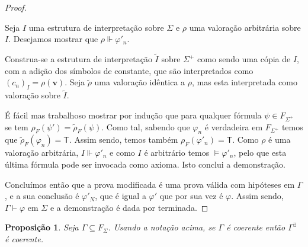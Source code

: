 \documentclass{report}
\newtheorem{prop}{Proposição}
\theoremstyle{definition}
\theoremstyle{remark}
\renewcommand{\bf}[1]{\mathbf{#1}}
\newcommand{\lt}{\mathsf{T}}
\begin{document}
\begin{proof}
\begin{enumerate}
	Seja $I$ uma estrutura de interpretação sobre $\Sigma$ e $\rho$ uma valoração arbitrária sobre $I$. Desejamos mostrar que $\rho \Vdash \varphi'_n$.
	
	Construa-se a estrutura de interpretação $\tilde I$ sobre $\Sigma^+$ como sendo uma cópia de $I$, com a adição dos símbolos de constante, que são interpretados como $(c_n)_I = \rho(\bf v)$. Seja $\tilde \rho$ uma valoração idêntica a $\rho$, mas esta interpretada como valoração sobre $\tilde I$.
	
	É fácil mas trabalhoso mostrar por indução que para qualquer fórmula $\psi \in F_{\Sigma^+}$ se tem $\rho_F(\psi') = \tilde\rho_F(\psi)$. Como tal, sabendo que $\varphi_n$ é verdadeira em $F_{\Sigma^+}$ temos que $\tilde\rho_F(\varphi_n) = \lt$. Assim sendo, temos também $\rho_F(\varphi'_n) = \lt$. Como $\rho$ é uma valoração arbitrária, $I \Vdash \varphi'_n$ e como $I$ é arbitrário temos $\vDash \varphi'_n$, pelo que esta última fórmula pode ser invocada como axioma. Isto conclui a demonstração.
	\end{enumerate}
	
	Concluímos então que a prova modificada é uma prova válida com hipóteses em $\Gamma$, e a sua conclusão é $\varphi'_N$, que é igual a $\varphi'$ que por sua vez é $\varphi$. Assim sendo, $\Gamma \vdash \varphi$ em $\Sigma$ e a demonstração é dada por terminada.
	\end{proof}
	
	\begin{prop}
	Seja $\Gamma \subseteq F_\Sigma$. Usando a notação acima, se $\Gamma$ é coerente então $\Gamma^\exists$ é coerente.
	\end{prop}
	
\end{document}
